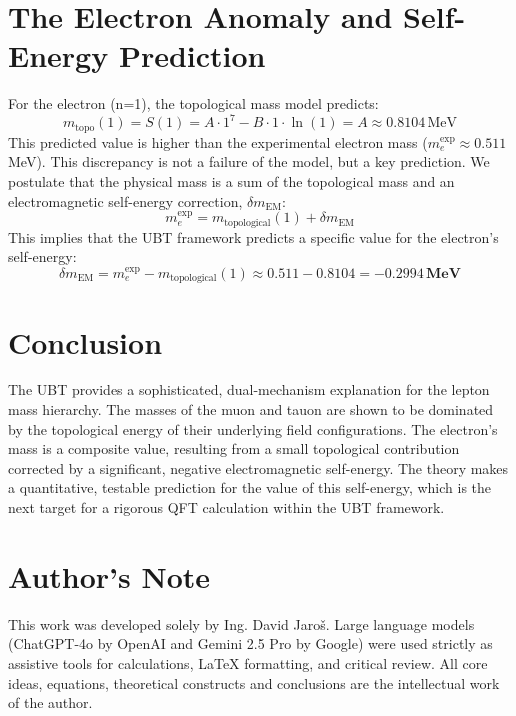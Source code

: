 \documentclass[12pt, a4paper]{article}
\begin{document}
\section{The Electron Anomaly and Self-Energy Prediction}
For the electron (n=1), the topological mass model predicts:
\begin{equation}
    m_{\text{topo}}(1) = S(1) = A \cdot 1^7 - B \cdot 1 \cdot \ln(1) = A \approx 0.8104 \, \text{MeV}
\end{equation}
This predicted value is higher than the experimental electron mass (\(m_e^{\text{exp}} \approx 0.511\) MeV). This discrepancy is not a failure of the model, but a key prediction. We postulate that the physical mass is a sum of the topological mass and an electromagnetic self-energy correction, \( \delta m_{\text{EM}} \):
\begin{equation}
    m_e^{\text{exp}} = m_{\text{topological}}(1) + \delta m_{\text{EM}}
\end{equation}
This implies that the UBT framework predicts a specific value for the electron's self-energy:
\begin{equation}
    \delta m_{\text{EM}} = m_e^{\text{exp}} - m_{\text{topological}}(1) \approx 0.511 - 0.8104 = \mathbf{-0.2994 \, \text{MeV}}
\end{equation}

\section{Conclusion}
The UBT provides a sophisticated, dual-mechanism explanation for the lepton mass hierarchy. The masses of the muon and tauon are shown to be dominated by the topological energy of their underlying field configurations. The electron's mass is a composite value, resulting from a small topological contribution corrected by a significant, negative electromagnetic self-energy. The theory makes a quantitative, testable prediction for the value of this self-energy, which is the next target for a rigorous QFT calculation within the UBT framework.


\section*{Author's Note}

This work was developed solely by Ing. David Jaroš.  
Large language models (ChatGPT-4o by OpenAI and Gemini 2.5 Pro by Google) were used strictly as assistive tools for calculations, LaTeX formatting, and critical review.  
All core ideas, equations, theoretical constructs and conclusions are the intellectual work of the author.
\end{document}
